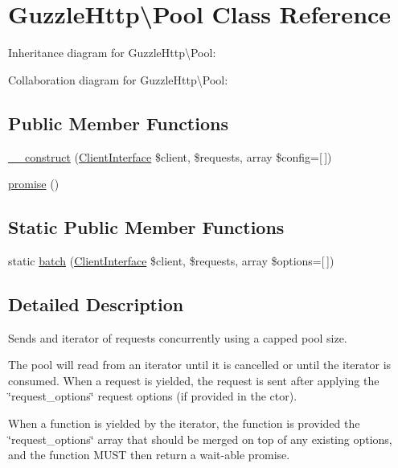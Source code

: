 \hypertarget{classGuzzleHttp_1_1Pool}{}\section{Guzzle\+Http\textbackslash{}Pool Class Reference}
\label{classGuzzleHttp_1_1Pool}


Inheritance diagram for Guzzle\+Http\textbackslash{}Pool\+:


Collaboration diagram for Guzzle\+Http\textbackslash{}Pool\+:
\subsection*{Public Member Functions}
\begin{DoxyCompactItemize}
\item 
\hyperlink{classGuzzleHttp_1_1Pool_a46a250ec314905753f79759808b8ae59}{\+\_\+\+\_\+construct} (\hyperlink{interfaceGuzzleHttp_1_1ClientInterface}{Client\+Interface} \$client, \$requests, array \$config=\mbox{[}$\,$\mbox{]})
\item 
\hyperlink{classGuzzleHttp_1_1Pool_a560fb5c3929b5d33fa6cc830c1dc1382}{promise} ()
\end{DoxyCompactItemize}
\subsection*{Static Public Member Functions}
\begin{DoxyCompactItemize}
\item 
static \hyperlink{classGuzzleHttp_1_1Pool_a819335632a3ef0763094b31e9c39c640}{batch} (\hyperlink{interfaceGuzzleHttp_1_1ClientInterface}{Client\+Interface} \$client, \$requests, array \$options=\mbox{[}$\,$\mbox{]})
\end{DoxyCompactItemize}


\subsection{Detailed Description}
Sends and iterator of requests concurrently using a capped pool size.

The pool will read from an iterator until it is cancelled or until the iterator is consumed. When a request is yielded, the request is sent after applying the \char`\"{}request\+\_\+options\char`\"{} request options (if provided in the ctor).

When a function is yielded by the iterator, the function is provided the \char`\"{}request\+\_\+options\char`\"{} array that should be merged on top of any existing options, and the function M\+U\+ST then return a wait-\/able promise. 

